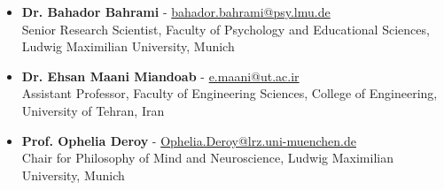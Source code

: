 \documentclass[a4paper,10pt]{article}
\begin{document}
\begin{itemize}
    \item \textbf{Dr. Bahador Bahrami} - \href{mailto:bahador.bahrami@psy.lmu.de}{bahador.bahrami@psy.lmu.de}\\
    Senior Research Scientist, Faculty of Psychology and Educational Sciences, Ludwig Maximilian University, Munich
    
    \item \textbf{Dr. Ehsan Maani Miandoab} - \href{mailto:e.maani@ut.ac.ir}{e.maani@ut.ac.ir}\\
    Assistant Professor, Faculty of Engineering Sciences, College of Engineering, University of Tehran, Iran
    
    \item \textbf{Prof. Ophelia Deroy} - \href{mailto:Ophelia.Deroy@lrz.uni-muenchen.de}{Ophelia.Deroy@lrz.uni-muenchen.de}\\
    Chair for Philosophy of Mind and Neuroscience, Ludwig Maximilian University, Munich
\end{itemize}
\end{document}
